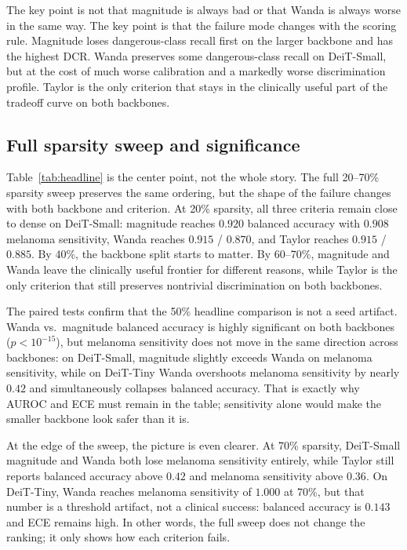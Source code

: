 \documentclass{article}
\newcommand{\DCR}{\ensuremath{\mathrm{DCR}}}
\begin{document}
The key point is not that magnitude is always bad or that Wanda is always worse in the same way. The key point is that the failure mode changes with the scoring rule. Magnitude loses dangerous-class recall first on the larger backbone and has the highest \DCR{}. Wanda preserves some dangerous-class recall on DeiT-Small, but at the cost of much worse calibration and a markedly worse discrimination profile. Taylor is the only criterion that stays in the clinically useful part of the tradeoff curve on both backbones.

\subsection{Full sparsity sweep and significance}
Table~\ref{tab:headline} is the center point, not the whole story. The full 20--70\% sparsity sweep preserves the same ordering, but the shape of the failure changes with both backbone and criterion. At 20\% sparsity, all three criteria remain close to dense on DeiT-Small: magnitude reaches $0.920$ balanced accuracy with $0.908$ melanoma sensitivity, Wanda reaches $0.915$ / $0.870$, and Taylor reaches $0.915$ / $0.885$. By 40\%, the backbone split starts to matter. By 60--70\%, magnitude and Wanda leave the clinically useful frontier for different reasons, while Taylor is the only criterion that still preserves nontrivial discrimination on both backbones.

The paired tests confirm that the 50\% headline comparison is not a seed artifact. Wanda vs.\ magnitude balanced accuracy is highly significant on both backbones ($p < 10^{-15}$), but melanoma sensitivity does not move in the same direction across backbones: on DeiT-Small, magnitude slightly exceeds Wanda on melanoma sensitivity, while on DeiT-Tiny Wanda overshoots melanoma sensitivity by nearly $0.42$ and simultaneously collapses balanced accuracy. That is exactly why AUROC and ECE must remain in the table; sensitivity alone would make the smaller backbone look safer than it is.

At the edge of the sweep, the picture is even clearer. At 70\% sparsity, DeiT-Small magnitude and Wanda both lose melanoma sensitivity entirely, while Taylor still reports balanced accuracy above $0.42$ and melanoma sensitivity above $0.36$. On DeiT-Tiny, Wanda reaches melanoma sensitivity of $1.000$ at 70\%, but that number is a threshold artifact, not a clinical success: balanced accuracy is $0.143$ and ECE remains high. In other words, the full sweep does not change the ranking; it only shows how each criterion fails.
\end{document}
